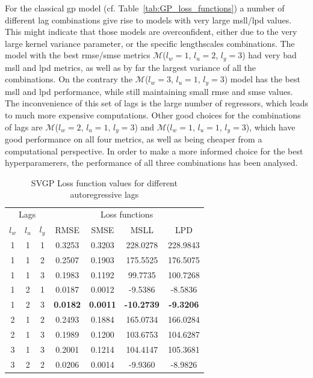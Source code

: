 For the classical \acrshort{gp} model (cf. Table~\ref{tab:GP_loss_functions}) a
number of different lag combinations give rise to models with very large
\acrshort{msll}/\acrshort{lpd} values. This might indicate that those models are
overconfident, either due to the very large kernel variance parameter, or the
specific lengthscales combinations. The model with the best
\acrshort{rmse}/\acrshort{smse} metrics $\mathcal{M}$($l_w = 1$, $l_u = 2$, $l_y
= 3$) had very bad \acrshort{msll} and \acrshort{lpd} metrics, as well as by far
the largest variance of all the combinations. On the contrary the
$\mathcal{M}$($l_w = 3$, $l_u = 1$, $l_y = 3$) model has the best
\acrshort{msll} and \acrshort{lpd} performance, while still maintaining small
\acrshort{rmse} and \acrshort{smse} values. The inconvenience of this set of
lags is the large number of regressors, which leads to much more expensive
computations. Other good choices for the combinations of lags are
$\mathcal{M}$($l_w = 2$, $l_u = 1$, $l_y = 3$) and $\mathcal{M}$($l_w = 1$, $l_u
= 1$, $l_y = 3$), which have good performance on all four metrics, as well as
being cheaper from a computational perspective. In order to make a more informed
choice for the best hyperparamerers, the performance of all three combinations
has been analysed.

\clearpage

\begin{table}[ht]
\centering
    \begin{tabular}{||c c c|c c c c||}
        \hline
        \multicolumn{3}{||c|}{Lags} & \multicolumn{4}{c||}{Loss functions}\\
        $l_w$ & $l_u$ & $l_y$ & RMSE & SMSE & MSLL & LPD\\
        \hline \hline
        1 & 1 & 1 & 0.3253 & 0.3203 & 228.0278 & 228.9843 \\
        1 & 1 & 2 & 0.2507 & 0.1903 & 175.5525 & 176.5075 \\
        1 & 1 & 3 & 0.1983 & 0.1192 & 99.7735 & 100.7268 \\
        1 & 2 & 1 & 0.0187 & 0.0012 & -9.5386 & -8.5836 \\
        1 & 2 & 3 & \textbf{0.0182} & \textbf{0.0011} & \textbf{-10.2739} &
        \textbf{-9.3206} \\
        2 & 1 & 2 & 0.2493 & 0.1884 & 165.0734 & 166.0284 \\
        2 & 1 & 3 & 0.1989 & 0.1200 & 103.6753 & 104.6287 \\
        3 & 1 & 3 & 0.2001 & 0.1214 & 104.4147 & 105.3681 \\
        3 & 2 & 2 & 0.0206 & 0.0014 & -9.9360 & -8.9826 \\
        \hline
    \end{tabular}
\caption{SVGP Loss function values for different autoregressive lags}
\label{tab:SVGP_loss_functions}
\end{table}


